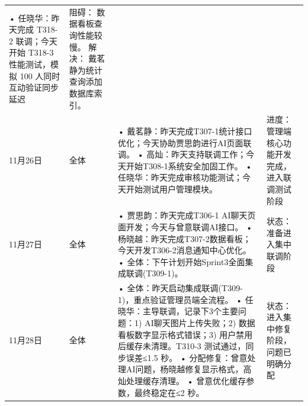 \begin{levellist}
\begin{longtable}{>{\centering\arraybackslash}m{1cm} >{\centering\arraybackslash}m{1cm} >{\centering\arraybackslash}m{9cm} >{\centering\arraybackslash}m{2.5cm}}
        • 任晓华：昨天完成 T318-2 联调；今天开始 T318-3 性能测试，模拟 100 人同时互动验证同步延迟                                       & 阻碍： 数据看板查询性能较慢。\newline
        解决： 戴茗静为统计查询添加数据库索引。                                                                                                                                                                                                  \\
        11月26日                                                                                         & 全体                             & • 戴茗静：昨天完成T307-1统计接口优化；今天协助贾思韵进行AI页面联调。 \newline
        • 高灿：昨天支持联调工作；今天开始T308-1系统安全加固工作。 \newline
        • 任晓华：昨天完成审核功能测试；今天开始测试用户管理模块。                                                                 & 进度： 管理端核心功能开发完成，进入联调测试阶段                                                                                             \\
        11月27日                                                                                         & 全体                             & • 贾思韵：昨天完成T306-1 AI聊天页面开发；今天与曾意联调AI接口。 \newline
        • 杨晓越：昨天完成T307-2数据看板；今天开发T306-2消息通知中心优化。 \newline
        • 全体：下午计划开始Sprint3全面集成联调(T309-1)。                                                              & 状态： 准备进入集中联调阶段                                                                                                       \\
        11月28日                                                                                         & 全体                             & • 全体：昨天启动集成联调(T309-1)，重点验证管理员端全流程。 \newline
        • 任晓华：主导联调，记录下3个主要问题：1) AI聊天图片上传失败；2) 数据看板数字显示格式错误；3) 用户禁用后缓存未清理。T310-3 测试通过，同步误差≤1.5 秒。 \newline
        • 分配修复：曾意处理AI问题，杨晓越修复显示格式，高灿处理缓存清理。 \newline
        • 曾意优化缓存参数，最终稳定在≤2 秒。                                                                          & 状态： 进入集中修复阶段，问题已明确分配                                                                                                 \\

\end{longtable}
\end{levellist}
